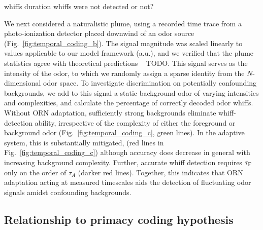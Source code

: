 \documentclass[9pt,twocolumn,twoside,lineno]{pnas-new}
\begin{document}
{\color {blue} whiffs duration whiffs were not detected or not?}

We next considered a naturalistic plume, using a recorded time trace from a photo-ionization detector placed downwind of an odor source (Fig.~\ref{fig:temporal_coding_b}). The signal magnitude was scaled linearly to values applicable to our model framework (a.u.), and we verified that the plume statistics agree with theoretical predictions {~\color{blue} TODO}. %
This signal serves as the intensity of the odor, to which we randomly assign a sparse identity from the $N$-dimensional odor space. To investigate discrimination on potentially confounding backgrounds, we add to this signal a static background odor of varying intensities and complexities, and calculate the percentage of correctly decoded odor whiffs. Without ORN adaptation, sufficiently strong backgrounds eliminate whiff-detection ability, irrespective of the complexity of either the foreground or background odor (Fig.~\ref{fig:temporal_coding_c}, green lines). In the adaptive system, this is substantially mitigated, (red lines in Fig.~\ref{fig:temporal_coding_c}) although accuracy does decrease in general with increasing background complexity. Further, accurate whiff detection requires $\tau_{\textup {F}}$ only on the order of $\tau_A$ (darker red lines). Together, this indicates that ORN adaptation acting at measured timescales  aids the detection of fluctuating odor signals amidst confounding backgrounds.

\subsection{Relationship to primacy coding hypothesis}
\end{document}
